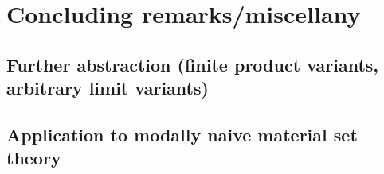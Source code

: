 \filestart

\section{Concluding remarks/miscellany}
\subsection{Further abstraction (finite product variants, arbitrary limit variants)}
\TODO

\subsection{Application to modally naive material set theory}

